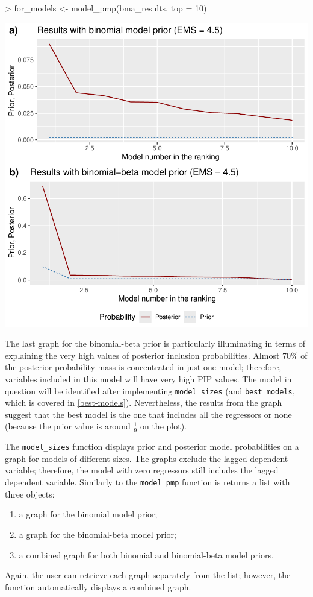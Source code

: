 \documentclass[a4paper]{article}
\begin{document}
\begin{Schunk}
\begin{Sinput}
> for_models <- model_pmp(bma_results, top = 10)
\end{Sinput}
\end{Schunk}
\includegraphics{bdsm_vignette-015}

The last graph for the binomial-beta prior is particularly illuminating in terms of explaining the very high values of posterior inclusion probabilities.
Almost 70\% of the posterior probability mass is concentrated in just one model; therefore, variables included in this model will have very high PIP values.
The model in question will be identified after implementing \verb+model_sizes+ (and \verb+best_models+, which is covered in \autoref{best-models}).
Nevertheless, the results from the graph suggest that the best model is the one that includes all the regressors or none
(because the prior value is around $\frac{1}{9}$ on the plot).

The \verb+model_sizes+ function displays prior and posterior model probabilities on a graph for models of different sizes.
The graphs exclude the lagged dependent variable; therefore, the model with zero regressors still includes the lagged dependent variable.
Similarly to the \verb+model_pmp+ function is returns a list with three objects:
\begin{enumerate}
    \item a graph for the binomial model prior;
    \item a graph for the binomial-beta model prior;
    \item a combined graph for both binomial and binomial-beta model priors.
\end{enumerate}
Again, the user can retrieve each graph separately from the list; however, the function automatically displays a combined graph.
\end{document}
